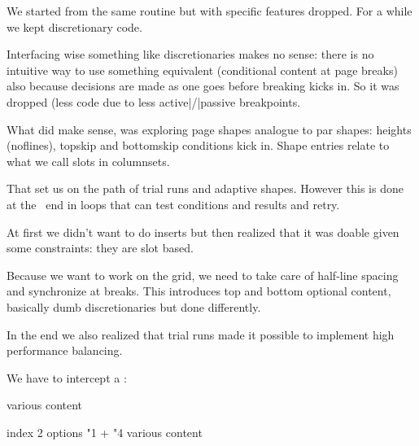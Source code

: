 \startitem
    We started from the same routine but with specific features dropped. For a
    while we kept discretionary code.
\stopitem

\startitem
    Interfacing wise something like discretionaries makes no sense: there is no
    intuitive way to use something equivalent (conditional content at page
    breaks) also because decisions are made as one goes before breaking kicks in.
    So it was dropped (less code due to less active|/|passive breakpoints.
\stopitem

\startitem
    What did make sense, was exploring page shapes analogue to par shapes:
    heights (noflines), topskip and bottomskip conditions kick in. Shape entries
    relate to what we call slots in columnsets.
\stopitem

\startitem
    That set us on the path of trial runs and adaptive shapes. However this is
    done at the \TEX\ end in loops that can test conditions and results and
    retry.
\stopitem

\startitem
    At first we didn't want to do inserts but then realized that it was doable given some
    constraints: they are slot based.
\stopitem

\startitem
    Because we want to work on the grid, we need to take care of half-line spacing and
    synchronize at breaks. This introduces top and bottom optional content, basically
    dumb discretionaries but done differently.
\stopitem

\startitem
    In the end we also realized that trial runs made it possible to implement high
    performance balancing.
\stopitem

\stopitemize

\stoptitle

\starttitle[title=Activities: intercept]

We have to intercept a :

\starttyping
{}
    various content
\endmvl

\setbox\scratchboxone{}

\beginmvl
    index 2
    options \numexpr "1 + "4\relax
\relax
    various content
\endmvl
\stoptyping

\setlayerframed
    [extratext]
    [frame=on,offset=2mm,strut=no,align=normal]
    \bgroup
    \egroup


